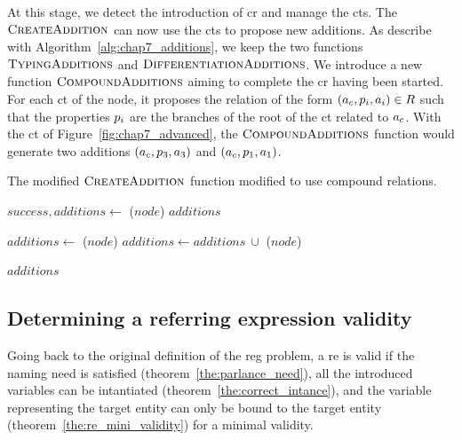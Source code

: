 At this stage, we detect the introduction of \acrshort{cr} and manage the \acrshort{ct}s. The $\textsc{CreateAddition}$ can now use the \acrshort{ct}s to propose new additions. As describe with Algorithm~\ref{alg:chap7_additions}, we keep the two functions $\textsc{TypingAdditions}$ and $\textsc{DifferentiationAdditions}$. We introduce a new function $\textsc{CompoundAdditions}$ aiming to complete the \acrshort{cr} having been started. For each \acrshort{ct} of the node, it proposes the relation of the form $(a_c, p_i, a_i) \in R$ such that the properties $p_i$ are the branches of the root of the \acrshort{ct} related to $a_c$. With the  \acrshort{ct} of Figure~\ref{fig:chap7_advanced}, the $\textsc{CompoundAdditions}$ function would generate two additions $(a_c, p_3, a_3)$ and $(a_c, p_1, a_1)$.

\begin{algorithm}[ht!]
\caption{\label{alg:chap7_additions} The modified $\textsc{CreateAddition}$ function modified to use compound relations. }

\begin{algorithmic}

        \State $success, additions\leftarrow$ \typingadditions($node$)
            \Return $additions$
        \EndIf
        
        \State $additions\leftarrow$ \compoundadditions($node$) 
        \State $additions\leftarrow additions\ \cup$ \differenceadditions($node$) 
        
        \Return $additions$
    \EndFunction
    
\end{algorithmic}
\end{algorithm}

\subsection{Determining a referring expression validity}

Going back to the original definition of the \acrshort{reg} problem, a \acrshort{re} is valid if the naming need is satisfied (theorem~\ref{the:parlance_need}), all the introduced variables can be intantiated (theorem~\ref{the:correct_intance}), and the variable representing the target entity can only be bound to the target entity (theorem~\ref{the:re_mini_validity}) for a minimal validity.

